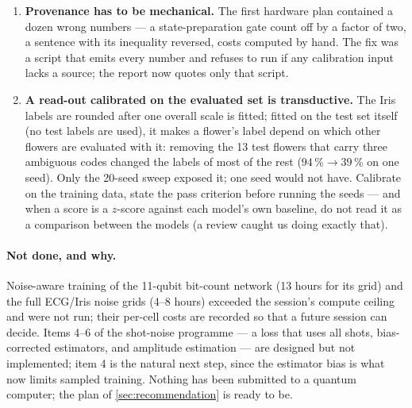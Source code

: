 \begin{enumerate}[leftmargin=*,itemsep=2pt]
\item \textbf{Provenance has to be mechanical.}  The first hardware plan contained a dozen
wrong numbers --- a state-preparation gate count off by a factor of two, a sentence with its
inequality reversed, costs computed by hand.  The fix was a script that emits every number and
refuses to run if any calibration input lacks a source; the report now quotes only that script.
\item \textbf{A read-out calibrated on the evaluated set is transductive.}  The Iris labels are
rounded after one overall scale is fitted; fitted on the test set itself (no test labels are
used), it makes a flower's label depend on which other flowers are evaluated with it: removing
the 13 test flowers that carry three ambiguous codes changed the labels of most of the rest
($94\,\% \to 39\,\%$ on one seed).  Only the 20-seed sweep exposed it; one seed would not have.
Calibrate on the training data, state the pass criterion before running the seeds --- and when a
score is a $z$-score against each model's own baseline, do not read it as a comparison between
the models (a review caught us doing exactly that).
\end{enumerate}

\paragraph{Not done, and why.}
Noise-aware training of the 11-qubit bit-count network (13 hours for its grid) and the full
ECG/Iris noise grids (4--8 hours) exceeded the session's compute ceiling and were not run;
their per-cell costs are recorded so that a future session can decide.  Items 4--6 of the
shot-noise programme --- a loss that uses all shots, bias-corrected estimators, and amplitude
estimation --- are designed but not implemented; item 4 is the natural next step, since the
estimator bias is what now limits sampled training.  Nothing has been submitted to a quantum
computer; the plan of \cref{sec:recommendation} is ready to be.
